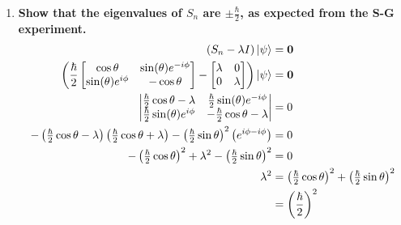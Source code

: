 \documentclass[11pt]{article}
\begin{document}
\begin{enumerate}[label=\textbf{\arabic*.}]
{\begin{enumerate}[label=\textbf{(\alph*)}]
{\begin{align*}
                        &=\frac \hbar 2 \begin{bmatrix}\cos\theta & \sin\theta(\cos\phi-i\sin\phi) \\ \sin\theta(\cos\phi+i\sin\phi) & -\cos\theta\end{bmatrix} \\
                        &=\frac \hbar 2 \begin{bmatrix}\cos\theta & \sin(\theta)e^{-i\phi} \\ \sin(\theta)e^{i\phi} & -\cos\theta\end{bmatrix} \\
                    \end{align*}
                }
                \item{
                    \textbf{\boldmath Show that the eigenvalues of \(S_n\) are \(\pm\frac{\hbar}{2}\), as expected from the S-G experiment.}
                    \begin{align*}
                        (S_n-\lambda I)\ket{\psi}&=\mathbf{0} \\
                        \left(\frac \hbar 2 \begin{bmatrix}\cos\theta & \sin(\theta)e^{-i\phi} \\ \sin(\theta)e^{i\phi} & -\cos\theta\end{bmatrix}-\begin{bmatrix}\lambda & 0 \\ 0 & \lambda\end{bmatrix}\right)\ket{\psi}&=\mathbf{0} \\
                        \begin{vmatrix}\frac \hbar 2 \cos\theta-\lambda & \frac \hbar 2 \sin(\theta)e^{-i\phi} \\ \frac \hbar 2 \sin(\theta)e^{i\phi} & -\frac \hbar 2 \cos\theta-\lambda\end{vmatrix}&=0 \\
                        -\left(\tfrac \hbar 2 \cos\theta-\lambda\right)\left(\tfrac \hbar 2 \cos\theta+\lambda\right)-\left(\tfrac \hbar 2 \sin\theta\right)^2\left(e^{i\phi-i\phi}\right)&=0 \\
                        -\left(\tfrac \hbar 2 \cos\theta\right)^2+\lambda^2-\left(\tfrac \hbar 2 \sin\theta\right)^2&=0 \\
                        \lambda^2&=\left(\tfrac \hbar 2 \cos\theta\right)^2+\left(\tfrac \hbar 2 \sin\theta\right)^2 \\
                        &=\left(\frac \hbar 2\right)^2 \\

\end{align*}}
\end{enumerate}}
\end{enumerate}
\end{document}
